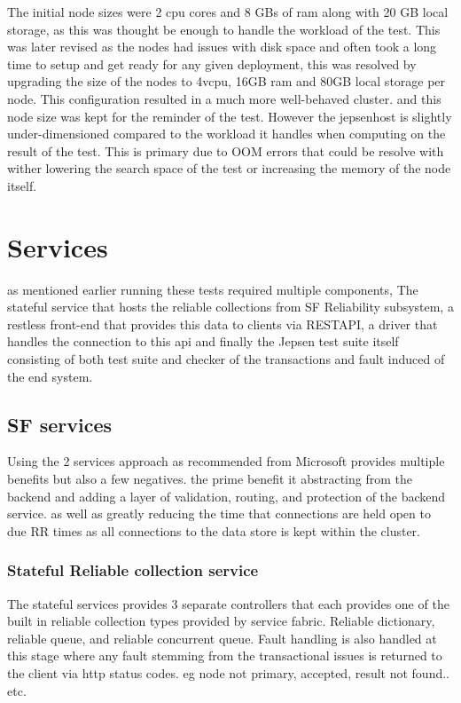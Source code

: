 \documentclass[a4paper,10pt,titlepage]{report}
\begin{document}
The initial node sizes were 2 cpu cores and 8 GBs of ram along with 20 GB local storage, as this was thought be enough to handle the workload of the test. This was later revised as the nodes had issues with disk space and often took a long time to setup and get ready for any given deployment, this was resolved by upgrading the size of the nodes to 4vcpu, 16GB ram and 80GB local storage per node. This configuration resulted in a much more well-behaved cluster. and this node size was kept for the reminder of the test. However the jepsenhost is slightly under-dimensioned compared to the workload it handles when computing on the result of the test. This is primary due to OOM errors that could be resolve with wither lowering the search space of the test or increasing the memory of the node itself.

\section{Services}
as mentioned earlier running these tests required multiple components, The stateful service that hosts the reliable collections from SF Reliability subsystem, a restless front-end that provides this data to clients via RESTAPI, a driver that handles the connection to this api and finally the Jepsen test suite itself consisting of both test suite and checker of the transactions and fault induced of the end system.

\subsection{SF services}
Using the 2 services approach as recommended from Microsoft provides multiple benefits but also a few negatives. the prime benefit it abstracting from the backend and adding a layer of validation, routing, and protection of the backend service. as well as greatly reducing the time that connections are held open to due RR times as all connections to the data store is kept within the cluster. 
\subsubsection{Stateful Reliable collection service}

The stateful services provides 3 separate controllers that each provides one of the built in reliable collection types provided by service fabric. Reliable dictionary, reliable queue, and reliable concurrent queue. Fault handling is also handled at this stage where any fault stemming from the transactional issues is returned to the client via http status codes\cite{https://en.wikipedia.org/wiki/List_of_HTTP_status_codes}. eg node not primary, accepted, result not found.. etc. 
\end{document}
